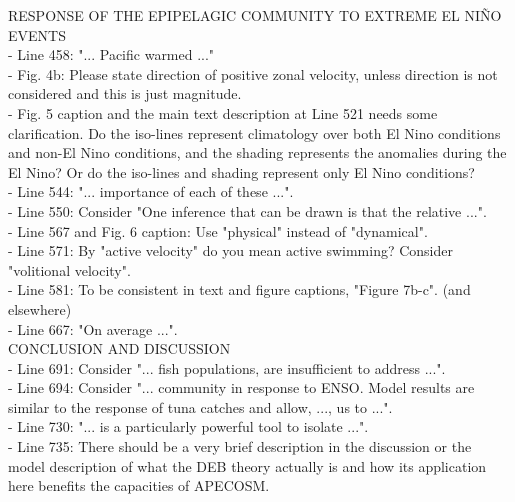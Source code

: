 \documentclass{article}
\begin{document}
RESPONSE OF THE EPIPELAGIC COMMUNITY TO EXTREME EL NIÑO EVENTS\\

- Line 458: "... Pacific warmed ..."\\

- Fig. 4b: Please state direction of positive zonal velocity, unless direction is not considered and this is just magnitude.\\

- Fig. 5 caption and the main text description at Line 521 needs some clarification. Do the iso-lines represent climatology over both El Nino conditions and non-El Nino conditions, and the shading represents the anomalies during the El Nino? Or do the iso-lines and shading represent only El Nino conditions?\\

- Line 544: "... importance of each of these ...".\\

- Line 550: Consider "One inference that can be drawn is that the relative ...".\\

- Line 567 and Fig. 6 caption: Use "physical" instead of "dynamical".\\

- Line 571: By "active velocity" do you mean active swimming? Consider "volitional velocity".\\

- Line 581: To be consistent in text and figure captions, "Figure 7b-c". (and elsewhere)\\

- Line 667: "On average ...".\\

CONCLUSION AND DISCUSSION\\

- Line 691: Consider "... fish populations, are insufficient to address ...".\\

- Line 694: Consider "... community in response to ENSO. Model results are similar to the response of tuna catches and allow, ..., us to ...".\\

- Line 730: "... is a particularly powerful tool to isolate ...".\\

- Line 735: There should be a very brief description in the discussion or the model description of what the DEB theory actually is and how its application here benefits the capacities of APECOSM.\\
\end{document}
